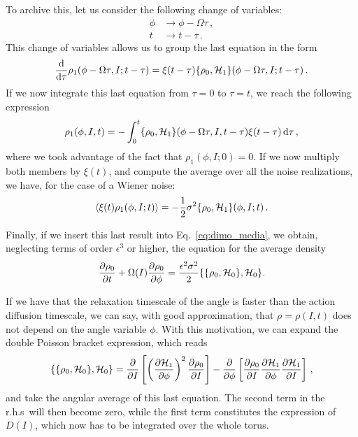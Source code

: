 To archive this, let us consider the following change of variables:
\begin{equation}
	\begin{aligned}
		\phi &\to \phi - \Omega \tau\,, \\
		t &\to t - \tau\,.
	\end{aligned}		
\end{equation}
This change of variables allows us to group the last equation in the form
\begin{equation}
	\dv{}{\tau}\/\rho_1(\phi - \Omega \tau, I; t - \tau) = \xi(t- \tau)\{\rho_0, \mathcal{H}_1\}(\phi - \Omega \tau, I; t - \tau)\,.
\end{equation}
If we now integrate this last equation from \(\tau = 0\) to \(\tau = t\), we reach the following expression
\begin{equation}
	\rho_1(\phi, I, t) = -\int_0^t\{\rho_0, \mathcal{H}_1\}(\phi - \Omega \tau, I, t - \tau)\xi(t-\tau)\,\mathrm{d}\tau\,,
\end{equation}
where we took advantage of the fact that \(\rho_1(\phi, I; 0)=0\). If we now multiply both members by \(\xi(t)\), and compute the average over all the noise realizations, we have, for the case of a Wiener noise:
\begin{equation}
	\langle \xi(t)\rho_1(\phi, I; t) \rangle = -\frac{1}{2}\sigma^2 \{\rho_0, \mathcal{H}_1\}(\phi, I; t)\,.
\end{equation}

Finally, if we insert this last result into Eq.~\eqref{eq:dimo_media}, we obtain, neglecting terms of order \(\epsilon^3\) or higher, the equation for the average density
\begin{equation}
 	\pdv{\rho_0}{t}\/ + \Omega (I) \pdv{\rho_0}{\phi}\/ = \frac{\epsilon^2 \sigma^2}{2}\{\{\rho_0, \mathcal{H}_0\}, \mathcal{H}_0\}.
\end{equation}

If we have that the relaxation timescale of the angle is faster than the action diffusion timescale, we can say, with good approximation, that \(\rho=\rho(I,t)\) does not depend on the angle variable \(\phi\). With this motivation, we can expand the double Poisson bracket expression, which reads
\begin{equation}
	\{\{\rho_0, \mathcal{H}_0\}, \mathcal{H}_0\} = \pdv{}{I}\/\left[\left(\pdv{\mathcal{H}_1}{\phi}\/\right)^2 \pdv{\rho_0}{I}\/\right] - \pdv{}{\phi}\/\left[\pdv{\rho_0}{I}\/\pdv{\mathcal{H}_1}{\phi}\/\pdv{\mathcal{H}_1}{I}\/\right]\,,
\end{equation}
and take the angular average of this last equation. The second term in the r.h.s\ will then become zero, while the first term constitutes the expression of \(D(I)\), which now has to be integrated over the whole torus.

